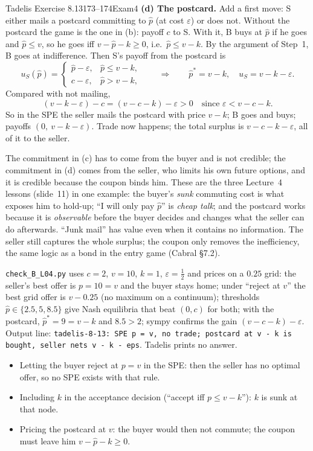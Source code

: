 \begin{exsol}{Tadelis Exercise 8.13}{173--174}{Exam}{4}
\textbf{(d) The postcard.} Add a first move: S either mails a postcard committing to $\hat p$ (at
cost $\varepsilon$) or does not. Without the postcard the game is the one in (b): payoff $c$ to S.
With it, B buys at $\hat p$ if he goes and $\hat p \le v$, so he goes iff
$v - \hat p - k \ge 0$, i.e.\ $\hat p \le v - k$. By the argument of Step~1, B goes at
indifference. Then S's payoff from the postcard is
\[
  u_S(\hat p) = \begin{cases} \hat p - \varepsilon, & \hat p \le v - k,\\
  c - \varepsilon, & \hat p > v - k, \end{cases}
  \qquad\Rightarrow\qquad \hat p^* = v - k,\quad u_S = v - k - \varepsilon .
\]
Compared with not mailing,
\[
  (v - k - \varepsilon) - c = (v - c - k) - \varepsilon > 0
  \quad\text{since } \varepsilon < v - c - k .
\]
So in the SPE the seller mails the postcard with price $v - k$; B goes and buys; payoffs
$(0,\ v - k - \varepsilon)$. Trade now happens; the total surplus is $v - c - k - \varepsilon$, all
of it to the seller.

\interp The commitment in (c) has to come from the buyer and is not credible; the commitment in
(d) comes from the seller, who limits his own future options, and it is credible because the
coupon binds him. These are the three Lecture~4 lessons (slide~11) in one example: the buyer's
\emph{sunk} commuting cost is what exposes him to hold-up; ``I will only pay $\hat p$'' is
\emph{cheap talk}; and the postcard works because it is \emph{observable} before the buyer decides
and changes what the seller can do afterwards. ``Junk mail'' has value even when it contains no
information. The seller still captures the whole surplus; the coupon only removes the inefficiency,
the same logic as a bond in the entry game (Cabral \S7.2).

\verify \texttt{check\_B\_L04.py} uses $c = 2$, $v = 10$, $k = 1$, $\varepsilon = \frac12$ and prices
on a $0.25$ grid: the seller's best offer is $p = 10 = v$ and the buyer stays home; under
``reject at $v$'' the best grid offer is $v - 0.25$ (no maximum on a continuum); thresholds
$\hat p \in \{2.5, 5, 8.5\}$ give Nash equilibria that beat $(0, c)$ for both; with the postcard,
$\hat p^* = 9 = v - k$ and $8.5 > 2$; sympy confirms the gain $(v - c - k) - \varepsilon$. Output line:
\texttt{tadelis-8-13: SPE p = v, no trade; postcard at v - k is bought, seller nets v - k - eps}.
Tadelis prints no answer.

\mistakes
\begin{itemize}
  \item Letting the buyer reject at $p = v$ in the SPE: then the seller has no optimal offer, so no
  SPE exists with that rule.
  \item Including $k$ in the acceptance decision (``accept iff $p \le v - k$''): $k$ is sunk at that
  node.
  \item Pricing the postcard at $v$: the buyer would then not commute; the coupon must leave him
  $v - \hat p - k \ge 0$.
\end{itemize}


\end{exsol}
